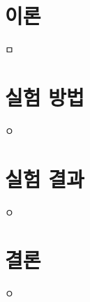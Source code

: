 \documentclass[a4paper, 10pt, nanum]{CSUniSchoolLabReport}
\begin{document}

\section{이론}

	ㅁ


\section{실험 방법}

	ㅇ


\section{실험 결과}

	ㅇ



\section{결론}

	ㅇ



\end{document}
